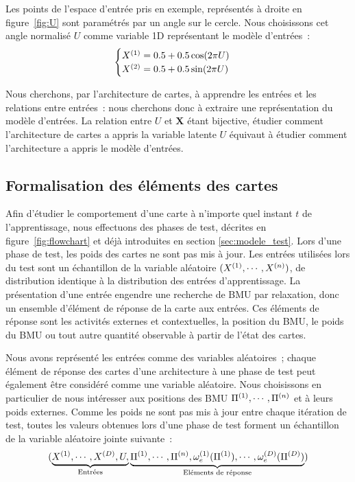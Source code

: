 \documentclass[../main]{subfiles}
\begin{document}
Les points de l'espace d'entrée pris en exemple, représentés à droite en figure~\ref{fig:U} sont paramétrés par un angle sur le cercle. Nous choisissons cet angle normalisé $U$ comme variable 1D représentant le modèle d'entrées~:
\begin{equation}
 \begin{cases}
     X^{({1})}= 0.5 + 0.5  \cos(2\pi U)\\
     X^{({2})} = 0.5 + 0.5 \sin(2 \pi U)
    \end{cases}\,
\end{equation}

Nous cherchons, par l'architecture de cartes, à apprendre les entrées et les relations entre entrées~: nous cherchons donc à extraire une représentation du modèle d'entrées. La relation entre $U$ et $\mathbf{X}$ étant bijective, étudier comment l'architecture de cartes a appris la variable latente $U$ équivaut à étudier comment l'architecture a appris le modèle d'entrées.

\subsection{Formalisation des éléments des cartes}

Afin d'étudier le comportement d'une carte à n'importe quel instant $t$ de l'apprentissage, nous effectuons des phases de test, décrites en figure~\ref{fig:flowchart} et déjà introduites en section \ref{sec:modele_test}.
Lors d'une phase de test, les poids des cartes ne sont pas mis à jour. 
Les entrées utilisées lors du test sont un échantillon de la variable aléatoire $(X^{({1})}, \cdots, X^{({n})})$, de distribution identique à la distribution des entrées d'apprentissage.
La présentation d'une entrée engendre une recherche de BMU par relaxation, donc un ensemble d'élément de réponse de la carte aux entrées. Ces éléments de réponse sont les activités externes et contextuelles, la position du BMU, le poids du BMU ou tout autre quantité observable à partir de l'état des cartes.

Nous avons représenté les entrées comme des variables aléatoires~; chaque élément de réponse des cartes d'une architecture à une phase de test peut également être considéré comme une variable aléatoire.
Nous choisissons en particulier de nous intéresser aux positions des BMU $\Pi^{({1})}, \cdots, \Pi^{({n})}$ et à leurs poids externes.
Comme les poids ne sont pas mis à jour entre chaque itération de test, toutes les valeurs obtenues lors d'une phase de test forment un échantillon de la variable aléatoire jointe suivante~:
$$(\underbrace{X^{({1})}, \cdots, X^{({D})}, U,}_{\text{Entrées}} \underbrace{\Pi^{({1})}, \cdots, \Pi^{({n})}, \omega_e^{({1})}(\Pi^{({1})}), \cdots, \omega_e^{({D})}(\Pi^{({D})})}_{\text{Eléments de réponse}})$$
\end{document}
